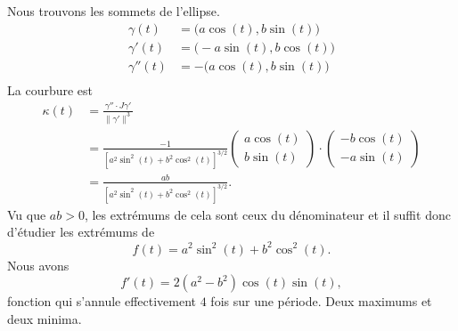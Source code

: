 \begin{example}
	Nous trouvons les sommets de l'ellipse.
	\begin{subequations}
		\begin{align}
			\gamma(t)   & =\big( a\cos(t),b\sin(t) \big)  \\
			\gamma'(t)  & =\big( -a\sin(t),b\cos(t) \big) \\
			\gamma''(t) & =-\big( a\cos(t),b\sin(t) \big) \\
		\end{align}
	\end{subequations}
	La courbure est
	\begin{subequations}
		\begin{align}
			\kappa(t) & =\frac{ \gamma''\cdot J\gamma' }{ \| \gamma' \|^3 }                             \\
			          & =\frac{-1}{ [a^2\sin^2(t)+b^2\cos^2(t)]^{3/2} }\begin{pmatrix}
				                                                           a\cos(t) \\
				                                                           b\sin(t)
			                                                           \end{pmatrix}\cdot\begin{pmatrix}
				                                                                             -b\cos(t) \\
				                                                                             -a\sin(t)
			                                                                             \end{pmatrix} \\
			          & =\frac{ ab }{  [a^2\sin^2(t)+b^2\cos^2(t)]^{3/2}  }.
		\end{align}
	\end{subequations}
	Vu que \( ab>0\), les extrémums de cela sont ceux du dénominateur et il suffit donc d'étudier les extrémums de
	\begin{equation}
		f(t)=a^2\sin^2(t)+b^2\cos^2(t).
	\end{equation}
	Nous avons
	\begin{equation}
		f'(t)=2(a^2-b^2)\cos(t)\sin(t),
	\end{equation}
	fonction qui s'annule effectivement \( 4\) fois sur une période. Deux maximums et deux minima.
\end{example}


